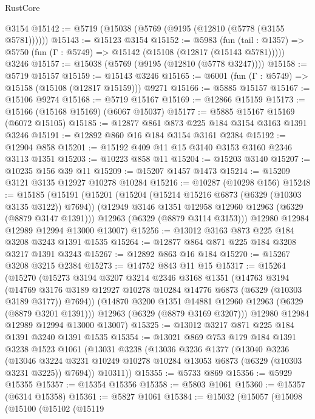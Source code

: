 \begin{lexlean}{RustCore}
\begin{coremodule}
    @3154
@15142 := @5719 (@15038 (@5769 (@9195 (@12810 (@5778 (@3155 @5781))))))
@15143 := @15123 @3154
@15152 := @5983
    (fun (tail : @1357) => @5750 (fun (Γ : @5749) => @15142 (@15108 (@12817 (@15143 @5781)))))
    @3246
@15157 := @15038 (@5769 (@9195 (@12810 (@5778 @3247))))
@15158 := @5719 @15157
@15159 := @15143 @3246
@15165 := @6001 (fun (Γ : @5749) => @15158 (@15108 (@12817 @15159))) @9271
@15166 := @5885 @15157
@15167 := @15106 @9274
@15168 := @5719 @15167
@15169 := @12866 @15159
@15173 := @15166 (@15168 @15169) (@6067 @15037)
@15177 := @5885 @15167 @15169 (@6072 @15105)
@15185 := @12877 @861 @873 @225 @184 @3154 @3163 @1391 @3246
@15191 := @12892 @860 @16 @184 @3154 @3161 @2384
@15192 := @12904 @858
@15201 := @15192 @409 @11 @15 @3140 @3153 @3160 @2346 @3113 @1351
@15203 := @10223 @858 @11
@15204 := @15203 @3140
@15207 := @10235 @156 @39 @11
@15209 := @15207 @1457 @1473
@15214 := @15209 @3121 @3135 @12927 @10278 @10284
@15216 := @10287 (@10298 @156)
@15248 := @15185
    (@15191
      (@15201
        (@15204 (@15214 @15216 @6873 (@6329 (@10303 @3135 @3122)) @7694))
        (@12949 @3146 @1351 @12958 @12960 @12963 (@6329 (@8879 @3147 @1391)))
        @12963
        (@6329 (@8879 @3114 @3153)))
      @12980
      @12984
      @12989
      @12994
      @13000
      @13007)
@15256 := @13012 @3163 @873 @225 @184 @3208 @3243 @1391 @1535
@15264 := @12877 @864 @871 @225 @184 @3208 @3217 @1391 @3243
@15267 := @12892 @863 @16 @184
@15270 := @15267 @3208 @3215 @2384
@15273 := @14752 @843 @11 @15
@15317 := @15264
    (@15270
      (@15273
        @3194
        @3207
        @3214
        @2346
        @3168
        @1351
        (@14763
          @3194
          (@14769 @3176 @3189 @12927 @10278 @10284 @14776 @6873 (@6329 (@10303 @3189 @3177)) @7694))
        (@14870 @3200 @1351 @14881 @12960 @12963 (@6329 (@8879 @3201 @1391)))
        @12963
        (@6329 (@8879 @3169 @3207)))
      @12980
      @12984
      @12989
      @12994
      @13000
      @13007)
@15325 := @13012 @3217 @871 @225 @184 @1391 @3240 @1391 @1535
@15354 := @13021
    @869
    @753
    @179
    @184
    @1391
    @3238
    @1523
    @1061
    (@13031
      @3238
      (@13036
        @3236
        @1377
        (@13040
          @3236
          (@13046 @3224 @3231 @10249 @10278 @10284 @13053 @6873 (@6329 (@10303 @3231 @3225)) @7694))
        @10311))
@15355 := @5733 @869
@15356 := @5929 @15355
@15357 := @15354 @15356
@15358 := @5803 @1061
@15360 := @15357 (@6314 @15358)
@15361 := @5827 @1061
@15384 := @15032
    (@15057
      (@15098
        (@15100
          (@15102
            (@15119

\end{coremodule}
\end{lexlean}
